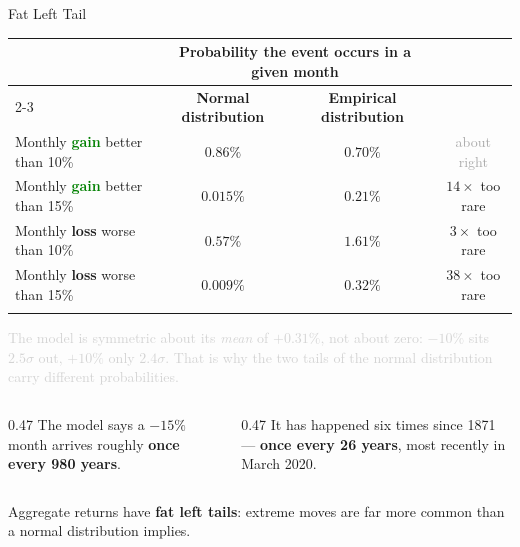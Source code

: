 \documentclass[9pt,english,aspectratio=169]{beamer}
\begin{document}
\begin{frame}{Fat Left Tail}

  \vspace{0.2em}
  \centering
  \renewcommand{\arraystretch}{1.5}
  \begin{tabular}{@{} l c c c @{}}
    \toprule
    & \multicolumn{2}{c}{\textbf{Probability the event occurs in a given month}} & \\
    \cmidrule(lr){2-3}
    & \textbf{Normal distribution} & \textbf{Empirical distribution} & \\
    \midrule
    Monthly \textcolor{green}{\textbf{gain}} better than 10\% & $0.86\%$ & $0.70\%$
      & {\small\textcolor{DarkGray}{about right}} \\
    Monthly \textcolor{green}{\textbf{gain}} better than 15\% & $0.015\%$ & $0.21\%$
      & {\small\textcolor{vermillion}{$14\times$ too rare}} \\
    \pause  
    Monthly \textcolor{vermillion}{\textbf{loss}} worse than 10\% & $0.57\%$ & $1.61\%$
      & {\small\textcolor{vermillion}{$3\times$ too rare}} \\
    Monthly \textcolor{vermillion}{\textbf{loss}} worse than 15\% & $0.009\%$ & $0.32\%$
      & {\small\textcolor{vermillion}{$38\times$ too rare}} \\
    \addlinespace
    \bottomrule
  \end{tabular}

  \vspace{0.4em}
  {\tiny\textcolor{lightgray}{The model is symmetric about its \emph{mean} of
  $+0.31\%$, not about zero: $-10\%$ sits $2.5\sigma$ out, $+10\%$ only
  $2.4\sigma$. That is why the two tails of the normal distribution carry
  different probabilities.}}
  \pause
  \vspace{0.2em}
  \begin{columns}[T]
    \begin{column}{0.47\textwidth}
      The model says a $-15\%$ month arrives roughly \textbf{once every 980
      years}.
    \end{column}
    \begin{column}{0.47\textwidth}
      It has happened six times since 1871 --- \textbf{once every 26 years},
      most recently in March 2020.
    \end{column}
  \end{columns}
  \pause

  \vspace{0.6em}
  \begin{insightbox}
    Aggregate returns have \textbf{fat left tails}: extreme moves are far more common than a
    normal distribution implies.
  \end{insightbox}

\end{frame}
\end{document}
